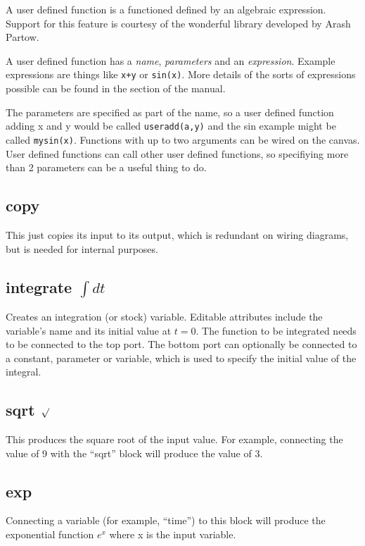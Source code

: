 A user defined function is a functioned defined by an algebraic
expression. Support for this feature is courtesy of the wonderful
library developed by Arash Partow.

A user defined function has a {\em name}, {\em parameters} and an {\em
  expression}. Example expressions are things like \verb'x+y' or
\verb'sin(x)'. More details of the sorts of expressions possible can be
found in the  section of the
manual.

The parameters are specified as part of the name, so a user defined
function adding x and y would be called \verb'useradd(a,y)' and the
sin example might be called \verb'mysin(x)'. Functions with up to two
arguments can be wired on the canvas. User defined functions can call other
user defined functions, so specifiying more than 2 parameters can be a
useful thing to do. 

\subsection{copy}\label{Operation:copy} This just copies its input to its output,
which is redundant on wiring diagrams, but is needed for internal
purposes.

\subsection{integrate $\int dt$}\label{IntOp}  Creates an integration (or stock)
variable. Editable attributes include the variable's name and its
initial value at $t=0$. The function to be integrated needs to be
connected to the top port. The bottom port can optionally be connected
to a constant, parameter or variable, which is used to specify the
initial value of the integral.

\subsection{sqrt $\surd$}\label{Operation:sqrt} This produces the square root of 
the input value. For example, connecting the value of 9 with the ``sqrt'' block will
produce the value of 3.

\subsection{exp}\label{Operation:exp} Connecting a variable (for example, ``time'')
to this block will produce the exponential function $e^{x}$ where x is the input variable. 

